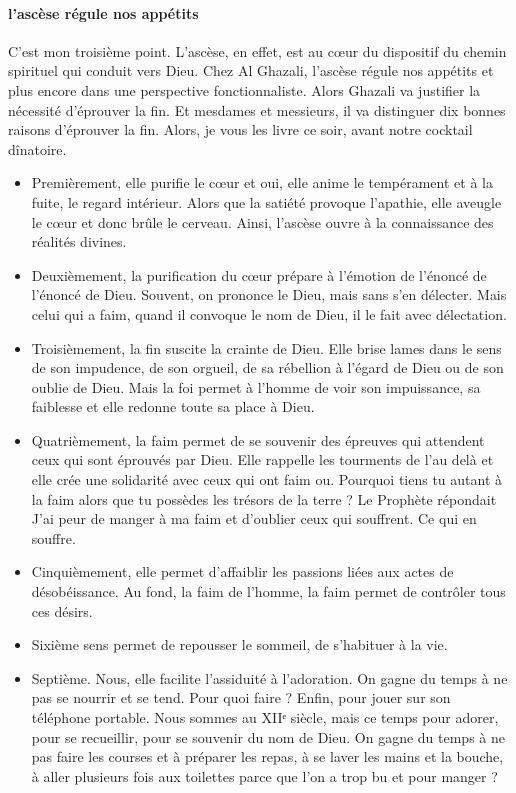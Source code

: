 \paragraph{l'ascèse régule nos appétits}
C'est mon troisième point. L'ascèse, en effet, est au cœur du dispositif du chemin spirituel qui conduit vers Dieu. Chez Al Ghazali, l'ascèse régule nos appétits et plus encore dans une perspective fonctionnaliste. Alors Ghazali va justifier la nécessité d'éprouver la fin. Et mesdames et messieurs, il va distinguer dix bonnes raisons d'éprouver la fin. Alors, je vous les livre ce soir, avant notre cocktail dînatoire.
\begin{itemize}
    \item Premièrement, elle purifie le cœur et oui, elle anime le tempérament et à la fuite, le regard intérieur. Alors que la satiété provoque l'apathie, elle aveugle le cœur et donc brûle le cerveau. Ainsi, l'ascèse ouvre à la connaissance des réalités divines.  
    \item Deuxièmement, la purification du cœur prépare à l'émotion de l'énoncé de l'énoncé de Dieu. Souvent, on prononce le Dieu, mais sans s'en délecter.
Mais celui qui a faim, quand il convoque le nom de Dieu, il le fait avec délectation.    \item Troisièmement, la fin suscite la crainte de Dieu. Elle brise lames dans le sens de son impudence, de son orgueil, de sa rébellion à l'égard de Dieu ou de son oublie de Dieu. Mais la foi permet à l'homme de voir son impuissance, sa faiblesse et elle redonne toute sa place à Dieu.
    \item Quatrièmement, la faim permet de se souvenir des épreuves qui attendent ceux qui sont éprouvés par Dieu. Elle rappelle les tourments de l'au delà et elle crée une solidarité avec ceux qui ont faim ou. Pourquoi tiens tu autant à la faim alors que tu possèdes les trésors de la terre ? Le Prophète répondait J'ai peur de manger à ma faim et d'oublier ceux qui souffrent.
Ce qui en souffre.     \item Cinquièmement, elle permet d'affaiblir les passions liées aux actes de désobéissance. Au fond, la faim de l'homme, la faim permet de contrôler tous ces désirs.     \item Sixième sens permet de repousser le sommeil, de s'habituer à la vie.     \item Septième. Nous, elle facilite l'assiduité à l'adoration. On gagne du temps à ne pas se nourrir et se tend. Pour quoi faire ?
Enfin, pour jouer sur son téléphone portable. Nous sommes au XIIᵉ siècle, mais ce temps pour adorer, pour se recueillir, pour se souvenir du nom de Dieu. On gagne du temps à ne pas faire les courses et à préparer les repas, à se laver les mains et la bouche, à aller plusieurs fois aux toilettes parce que l'on a trop bu et pour manger ?

\end{itemize}
